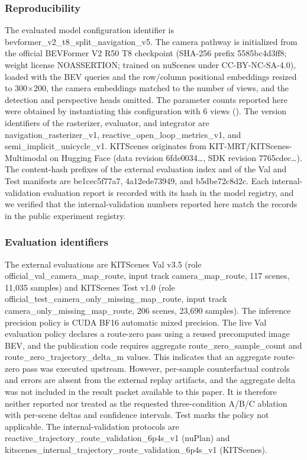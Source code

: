 \documentclass[
  english,
  10pt,
]{article}
\begin{document}
\subsubsection{Reproducibility}\label{reproducibility}

The evaluated model configuration identifier is
bevformer\_v2\_t8\_split\_navigation\_v5. The camera pathway is
initialized from the official BEVFormer V2 R50 T8 checkpoint (SHA-256
prefix 5585bc4d3ff8; weight license NOASSERTION; trained on nuScenes
under CC-BY-NC-SA-4.0), loaded with the BEV queries and the row/column
positional embeddings resized to 300×200, the camera embeddings matched
to the number of views, and the detection and perspective heads omitted.
The parameter counts reported here were obtained by instantiating this
configuration with 6 views (\hyperref[tab-params]{}). The version
identifiers of the rasterizer, evaluator, and integrator are
navigation\_rasterizer\_v1, reactive\_open\_loop\_metrics\_v1, and
semi\_implicit\_unicycle\_v1. KITScenes originates from
KIT-MRT/KITScenes-Multimodal on Hugging Face (data revision
6fde0034\ldots, SDK revision 7765cdec\ldots). The content-hash prefixes
of the external evaluation index and of the Val and Test manifests are
be1cec5f77a7, 4a12ede73949, and b5dbe72c8d2c. Each internal-validation
evaluation report is recorded with its hash in the model registry, and
we verified that the internal-validation numbers reported here match the
records in the public experiment registry.

\subsubsection{Evaluation identifiers}\label{evaluation-identifiers}

The external evaluations are KITScenes Val v3.5 (role
official\_val\_camera\_map\_route, input track camera\_map\_route, 117
scenes, 11,035 samples) and KITScenes Test v1.0 (role
official\_test\_camera\_only\_missing\_map\_route, input track
camera\_only\_missing\_map\_route, 206 scenes, 23,690 samples). The
inference precision policy is CUDA BF16 automatic mixed precision. The
live Val evaluation policy declares a route-zero pass using a reused
precomputed image BEV, and the publication code requires aggregate
route\_zero\_sample\_count and route\_zero\_trajectory\_delta\_m values.
This indicates that an aggregate route-zero pass was executed upstream.
However, per-sample counterfactual controls and errors are absent from
the external replay artifacts, and the aggregate delta was not included
in the result packet available to this paper. It is therefore neither
reported nor treated as the requested three-condition A/B/C ablation
with per-scene deltas and confidence intervals. Test marks the policy
not applicable. The internal-validation protocols are
reactive\_trajectory\_route\_validation\_6p4s\_v1 (nuPlan) and
kitscenes\_internal\_trajectory\_route\_validation\_6p4s\_v1
(KITScenes).
\end{document}
